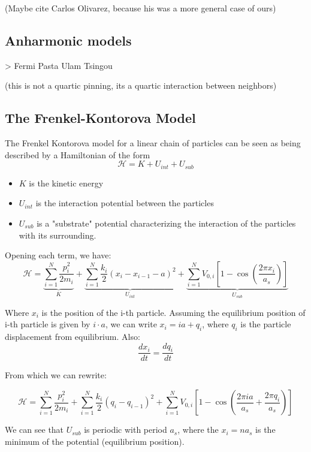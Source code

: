 (Maybe cite Carlos Olivarez, because his was a more general case of ours)


\subsection{Anharmonic models}

> Fermi Pasta Ulam Tsingou

(this is not a quartic pinning, its a quartic interaction between neighbors)

\subsection{The Frenkel-Kontorova Model}

The Frenkel Kontorova model for a linear chain of particles can be seen as being described by a Hamiltonian of the form 
\[ \mathcal{H} = K + U_{int} + U_{sub} \]

\begin{itemize}
	\item $ K $ is the kinetic energy
	\item $ U_{int} $ is the interaction potential between the particles
	\item $ U_{sub} $ is a "substrate" potential characterizing the interaction of the particles with its surrounding.
\end{itemize}

Opening each term, we have:
\[ 
\mathcal{H} = \underbrace{\sum_{i=1}^{N}\frac{p_{i}^{2}}{2m_i}}_{K} + 
\underbrace{\sum_{i=1}^{N} \frac{k_i}{2}(x_{i} - x_{i-1} - a)^{2}}_{U_{int}} +
\underbrace{\sum_{i=1}^{N} V_{0,i}\left[1 - \cos \left( \frac{2\pi x_{i}}{a_{s}}\right)\right]}_{U_{sub}}
\]

Where $ x_i $ is the position of the i-th particle. Assuming the equilibrium position of i-th particle is given by $ i\cdot a $, we can write $ x_i = ia + q_{i}$, where $ q_{i} $ is the particle displacement from equilibrium. Also:
\[ \frac{dx_{i}}{dt} =  \frac{dq_{i}}{dt}\]

From which we can rewrite:

\[ 
\mathcal{H} = \sum_{i=1}^{N}\frac{p_{i}^{2}}{2m_i} + 
\sum_{i=1}^{N} \frac{k_i}{2}(q_{i} - q_{i-1})^{2} +
\sum_{i=1}^{N} V_{0,i}\left[1 - 
\cos \left( \frac{2\pi i a}{a_{s}} + \frac{2\pi q_{i}}{a_{s}}\right)\right]
\]

We can see that $ U_{sub} $ is periodic with period $ a_s $, where the $ x_i = n a_s $ is the minimum of the potential (equilibrium position).


